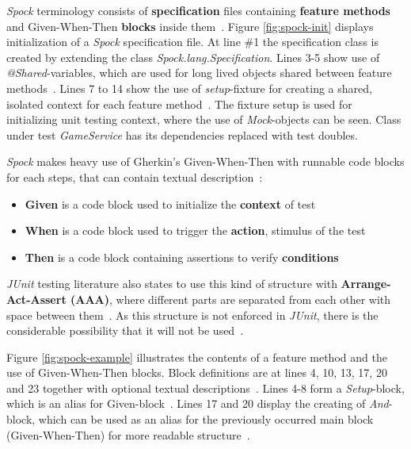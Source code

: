     \textit{Spock} terminology consists of \textbf{specification} files containing \textbf{feature methods} and Given-When-Then
    \textbf{blocks} inside them~\cite{spock}. Figure \ref{fig:spock-init} displays initialization of a \textit{Spock} specification
    file. At line \#1 the specification class is created by extending the class \textit{Spock.lang.Specification}. Lines
    3-5 show use of \textit{@Shared}-variables, which are used for long lived objects shared between feature methods~\cite{spock}.
    Lines 7 to 14 show the use of \textit{setup}-fixture for creating a shared, isolated context for each feature method~\cite{spock}.
    The fixture setup is used for initializing unit testing context, where the use of \textit{Mock}-objects can be seen.
    Class under test \textit{GameService} has its dependencies replaced with test doubles.

    \textit{Spock} makes heavy use of Gherkin's Given-When-Then with runnable code blocks for each steps, that can contain textual
    description~\cite{kapelonis2016java}:
    \begin{itemize}
    \item \textbf{Given} is a code block used to initialize the \textbf{context} of test
    \item \textbf{When} is a code block used to trigger the \textbf{action}, stimulus of the test
    \item \textbf{Then} is a code block containing assertions to verify \textbf{conditions}
    \end{itemize}
    \textit{JUnit} testing literature also states to use this kind of structure with \textbf{Arrange-Act-Assert (AAA)},
    where different parts are separated from each other with space between them~\cite{langr2015pragmatic}.
    As this structure is not enforced in \textit{JUnit}, there is the considerable possibility that it will not be used~\cite{kapelonis2016java}.

    Figure \ref{fig:spock-example} illustrates the contents of a feature method and the use of Given-When-Then blocks.
    Block definitions are at lines 4, 10, 13, 17, 20 and 23 together
    with optional textual descriptions~\cite{spock}.
    Lines 4-8 form a \textit{Setup}-block, which is an alias for Given-block~\cite{spock}.
    Lines 17 and 20 display the creating of \textit{And}-block, which can be used as
    an alias for the previously occurred main block (Given-When-Then) for more readable structure~\cite{kapelonis2016java}.

